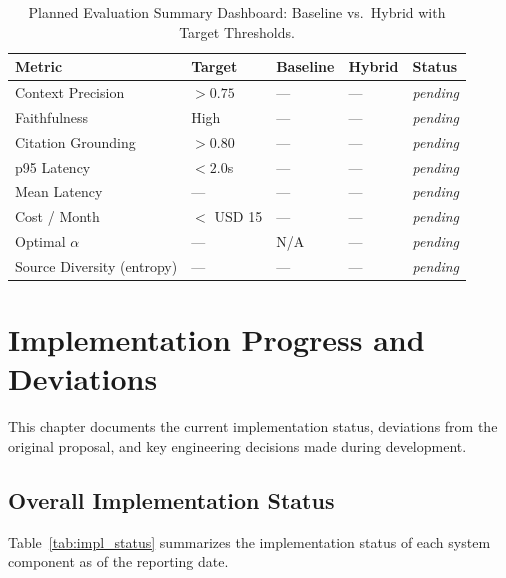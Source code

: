 \documentclass[12pt,a4paper]{report}
\begin{document}
\begin{table}[H]
\caption{Planned Evaluation Summary Dashboard: Baseline vs.\ Hybrid with Target Thresholds.}
\label{tab:viz_dashboard}
\centering
\begin{tabular}{p{3.5cm}p{2.0cm}p{2.0cm}p{2.0cm}p{2.5cm}}
\toprule
\textbf{Metric} & \textbf{Target} & \textbf{Baseline} & \textbf{Hybrid} & \textbf{Status} \\
\midrule
Context Precision & $> 0.75$ & --- & --- & \textit{pending} \\
Faithfulness & High & --- & --- & \textit{pending} \\
Citation Grounding & $> 0.80$ & --- & --- & \textit{pending} \\
p95 Latency & $< 2.0$s & --- & --- & \textit{pending} \\
Mean Latency & --- & --- & --- & \textit{pending} \\
Cost / Month & $<$ USD 15 & --- & --- & \textit{pending} \\
Optimal $\alpha$ & --- & N/A & --- & \textit{pending} \\
Source Diversity (entropy) & --- & --- & --- & \textit{pending} \\
\bottomrule
\end{tabular}
\end{table}

\chapter{Implementation Progress and Deviations}
\label{ch:progress}

This chapter documents the current implementation status, deviations from the original proposal, and key engineering decisions made during development.

\section{Overall Implementation Status}
\label{sec:impl_status}

Table~\ref{tab:impl_status} summarizes the implementation status of each system component as of the reporting date.
\end{document}
